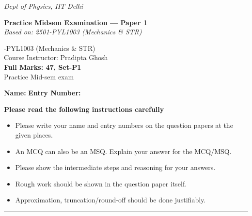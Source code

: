 \documentclass[11pt]{article}
\begin{document}
\begin{center}
  {\small\textit{Dept of Physics, IIT Delhi}}
\end{center}

\noindent
\begin{minipage}{0.62\linewidth}
  {\large\bfseries Practice Midsem Examination --- Paper 1}\\[2pt]
  \textit{Based on: 2501-PYL1003 (Mechanics \& STR)}
\end{minipage}
\hfill
\begin{minipage}{0.36\linewidth}-PYL1003 (Mechanics \& STR)\\
  Course Instructor: Pradipta Ghosh\\
  \textbf{Full Marks: 47, Set-P1}\\
  Practice Mid-sem exam
\end{minipage}

\vspace{6pt}
\noindent\textbf{Name:} \underline{\hspace{6cm}} \qquad \textbf{Entry Number:} \underline{\hspace{4cm}}

\vspace{10pt}
\noindent\textbf{Please read the following instructions carefully}
\begin{itemize}[leftmargin=1.4em]
  \item Please write your name and entry numbers on the question papers at the given places.
  \item An MCQ can also be an MSQ. Explain your answer for the MCQ/MSQ.
  \item Please show the intermediate steps and reasoning for your answers.
  \item Rough work should be shown in the question paper itself.
  \item Approximation, truncation/round-off should be done justifiably.
\end{itemize}

\vspace{8pt}
\hrule
\vspace{10pt}
\end{document}
